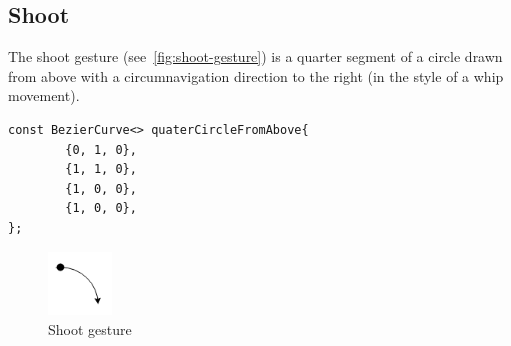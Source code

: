 \subsection{Shoot}
The shoot gesture (see~\autoref{fig:shoot-gesture}) is a quarter segment of a circle drawn from above with a circumnavigation direction to the right (in the style of a whip movement).

\begin{lstlisting}
const BezierCurve<> quaterCircleFromAbove{
        {0, 1, 0},
        {1, 1, 0},
        {1, 0, 0},
        {1, 0, 0},
};
\end{lstlisting}

\begin{figure}[!ht]
    \centering
    \includegraphics[width=0.15\textwidth]{pictures/shoot-gesture.png}
    \caption{Shoot gesture}
    \label{fig:shoot-gesture}
\end{figure}